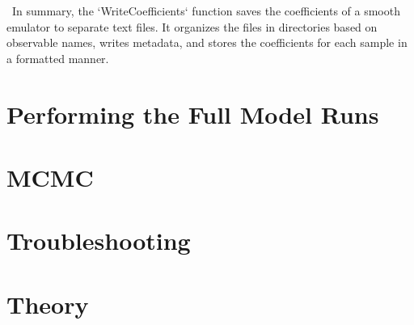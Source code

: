 \documentclass[12pt]{article}
\numberwithin{equation}{section}
\numberwithin{figure}{section}
\begin{document}
\ In summary, the `WriteCoefficients` function saves the coefficients of a smooth emulator to separate text files. It organizes the files in directories based on observable names, writes metadata, and stores the coefficients for each sample in a formatted manner. \\


\section{Performing the Full Model Runs}


\section{MCMC}


\section{Troubleshooting}


\section{Theory}
\end{document}
